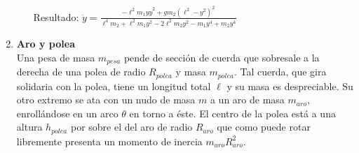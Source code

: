 \documentclass[11pt, spanish, a4paper, twoside]{article}
\begin{document}
\begin{enumerate}
\begin{minipage}[t][5cm]{0.75\textwidth}
\begin{enumerate}
		Resultado:
			$\ddot{y} = \frac{- \ell^{2} m_{1} y \dot{y}^{2} + g m_{2} \left(\ell^{2} - y^{2}\right)^{2}}{\ell^{4} m_{2} + \ell^{2} m_{1} y^{2} - 2 \ell^{2} m_{2} y^{2} - m_{1} y^{4} + m_{2} y^{4}}$
			\qquad
	\end{enumerate}
	\end{minipage}
	\begin{minipage}[c][0cm][t]{0.25\textwidth}
		
	\end{minipage}


	\item 
	\begin{minipage}[t][6cm]{0.57\textwidth}
		\textbf{Aro y polea}\\
		Una pesa de masa \(m_{pesa}\) pende de sección de cuerda que sobresale a la derecha de una polea de radio \(R_{polea}\) y masa \(m_{polea}\).
		Tal cuerda, que gira solidaria con la polea, tiene un longitud total \(\ell\) y su masa es despreciable.
		Su otro extremo se ata con un nudo de masa \(m\) a un aro de masa \(m_{aro}\), enrollándose en un arco \(\theta\) en torno a éste.
		El centro de la polea está a una altura \(h_{polea}\) por sobre el del aro de radio \(R_{aro}\) que como puede rotar libremente presenta un momento de inercia \(m_{aro} R_{aro}^2\).


\end{minipage}
\end{enumerate}
\end{document}
